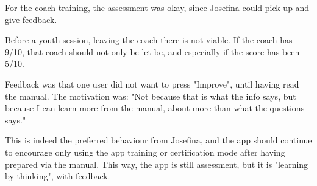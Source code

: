   For the coach training, the assessment was okay, since Josefina could pick up and give feedback.

  Before a youth session, leaving the coach there is not viable. If the coach has 9/10, that coach should not only be let be, and especially if the score has been 5/10.

  Feedback was that one user did not want to press "Improve", until having read the manual. The motivation was: "Not because that is what the info says, but because I can learn more from the manual, about more than what the questions says."

  This is indeed the preferred behaviour from Josefina, and the app should continue to encourage only using the app training or certification mode after having prepared via the manual. This way, the app is still assessment, but it is "learning by thinking", with feedback.

